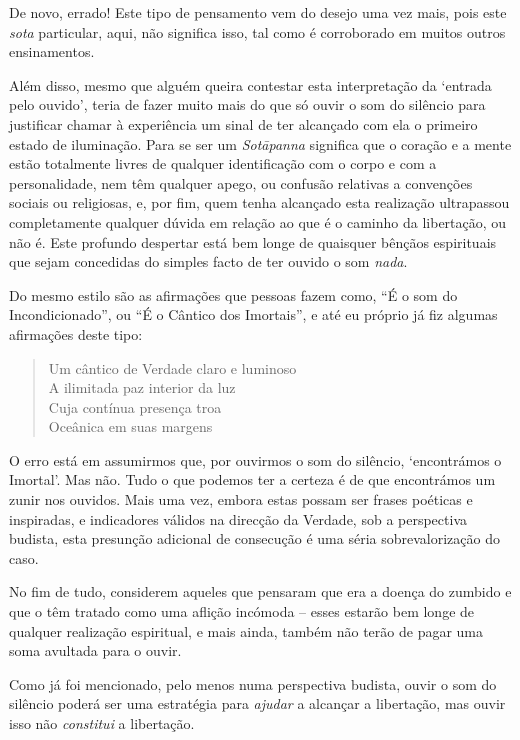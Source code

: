 De novo, errado! Este tipo de pensamento vem do desejo uma vez mais,
pois este \emph{sota} particular, aqui, não significa isso, tal como é
corroborado em muitos outros ensinamentos.\cite{ensinamentos}

Além disso, mesmo que alguém queira contestar esta interpretação da
`entrada pelo ouvido', teria de fazer muito mais do que só ouvir o som
do silêncio para justificar chamar à experiência um sinal de ter
alcançado com ela o primeiro estado de iluminação. Para se ser um
\emph{Sotāpanna} significa que o coração e a mente estão totalmente
livres de qualquer identificação com o corpo e com a personalidade, nem
têm qualquer apego, ou confusão relativas a convenções sociais ou
religiosas, e, por fim, quem tenha alcançado esta realização ultrapassou
completamente qualquer dúvida em relação ao que é o caminho da
libertação, ou não é. Este profundo despertar está bem longe de
quaisquer bênçãos espirituais que sejam concedidas do simples facto de
ter ouvido o som \emph{nada}.

Do mesmo estilo são as afirmações que pessoas fazem como, ``É o som do
Incondicionado'', ou ``É o Cântico dos Imortais'', e até eu próprio já
fiz algumas afirmações deste tipo:

\begin{quotation}
Um cântico de Verdade claro e luminoso\\
A ilimitada paz interior da luz\\
Cuja contínua presença troa\\
Oceânica em suas margens\cite{portrait}
\end{quotation}

O erro está em assumirmos que, por ouvirmos o som do silêncio,
`encontrámos o Imortal'. Mas não. Tudo o que podemos ter a certeza é de
que encontrámos um zunir nos ouvidos. Mais uma vez, embora estas possam
ser frases poéticas e inspiradas, e indicadores válidos na direcção da
Verdade, sob a perspectiva budista, esta presunção adicional de
consecução é uma séria sobrevalorização do caso.

No fim de tudo, considerem aqueles que pensaram que era a doença do
zumbido e que o têm tratado como uma aflição incómoda -- esses estarão
bem longe de qualquer realização espiritual, e mais ainda, também não
terão de pagar uma soma avultada para o ouvir.

Como já foi mencionado, pelo menos numa perspectiva budista, ouvir o som
do silêncio poderá ser uma estratégia para \emph{ajudar} a alcançar a
libertação, mas ouvir isso não \emph{constitui} a libertação.

